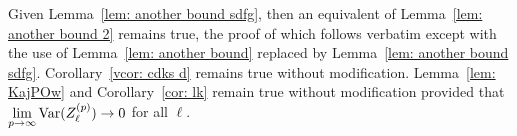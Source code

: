 Given Lemma~\ref{lem: another bound sdfg}, then an equivalent of Lemma~\ref{lem: another bound 2} remains true, the proof of which follows verbatim except with the use of Lemma~\ref{lem: another bound} replaced by Lemma~\ref{lem: another bound sdfg}. Corollary~\ref{vcor: cdks d} remains true without modification. Lemma~\ref{lem: KajPOw} and Corollary~\ref{cor: lk} remain true without modification provided that \(\lim\limits_{p\to\infty}\mathrm{Var}(Z_\ell^{(p)})\to 0\) for all \(\ell\). 

































